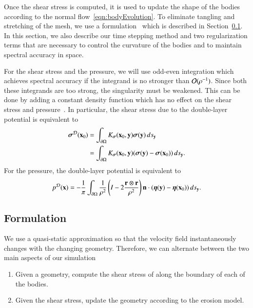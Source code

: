 \documentclass[preprint, 10pt]{elsarticle}
\begin{document}
Once the shear stress is computed, it is used to update the shape of the
bodies according to the normal flow~\eqref{eqn:bodyEvolution}.  To
eliminate tangling and stretching of the mesh, we use a {\thL}
formulation~\cite{hou-low-she1994} which is described in
Section~\ref{sec:thetaL}.  In this section, we also describe our time
stepping method and two regularization terms that are necessary to
control the curvature of the bodies and to maintain spectral accuracy in
space.


For the shear stress and the pressure, we will use odd-even integration
which achieves spectral accuracy if the integrand is no stronger than
${\mathcal{O}}(\rho^{-1})$.  Since both these integrands are too strong, the
singularity must be weakened.  This can be done by adding a constant
density function which has no effect on the shear stress and
pressure~\cite{poz1992}.  In particular, the shear stress due to the
double-layer potential is equivalent to
\begin{align*}
  {\boldsymbol\sigma}^{{\mathcal{D}}}({\mathbf{x}}_0) &= \int_{{\partial}\Omega}K_{\boldsymbol\sigma}({\mathbf{x}}_0,{\mathbf{y}})
      {\boldsymbol\sigma}({\mathbf{y}}) \, ds_{{\mathbf{y}}} \\ 
      &= \int_{{\partial}\Omega}K_{\boldsymbol\sigma}({\mathbf{x}}_0,{\mathbf{y}})
      ({\boldsymbol\sigma}({\mathbf{y}}) - {\boldsymbol\sigma}({\mathbf{x}}_0)) \, ds_{{\mathbf{y}}}.
\end{align*}
For the pressure, the double-layer potential is equivalent to
\begin{align*}
  p^{\mathcal{D}}({\mathbf{x}}) = -\frac{1}{\pi}\int_{{\partial}\Omega} \frac{1}{\rho^2}
    \left(I - 2 \frac{{\mathbf{r}} \otimes {\mathbf{r}}}{\rho^2}\right) 
    {\mathbf{n}} \cdot ({\boldsymbol\eta}({\mathbf{y}}) - {\boldsymbol\eta}({\mathbf{x}}_0)) \,ds_{\mathbf{y}}.
\end{align*}



\subsection{{\thL} Formulation} 
\label{sec:thetaL}

We use a quasi-static approximation so that the velocity field
instantaneously changes with the changing geometry.  Therefore, we can
alternate between the two main aspects of our simulation
\begin{enumerate}
  \item Given a geometry, compute the shear stress of along the boundary
    of each of the bodies.
  \item Given the shear stress, update the geometry according to the
    erosion model.
\end{enumerate}
\end{document}
